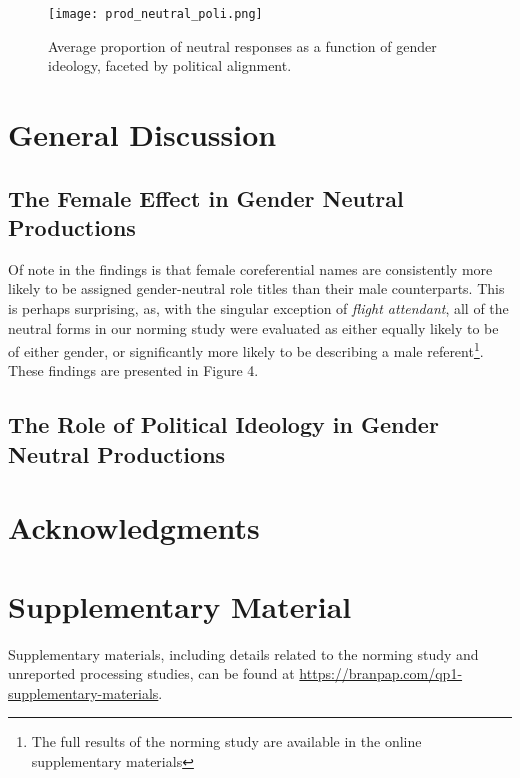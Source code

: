 \begin{figure*}[ht!]
	\centering
	\texttt{[image: prod\_neutral\_poli.png]}
	\caption{Average proportion of neutral responses as a function of gender ideology, faceted by political alignment.}
	\label{prod-neutral-poli}
\end{figure*}
\section{General Discussion}

\subsection{The Female Effect in Gender Neutral Productions}
Of note in the findings is that female coreferential names are consistently more likely to be assigned gender-neutral role titles than their male counterparts. This is perhaps surprising, as, with the singular exception of \textit{flight attendant}, all of the neutral forms in our norming study were evaluated as either equally likely to be of either gender, or significantly more likely to be describing a male referent\footnote{The full results of the norming study are available in the online supplementary materials}. These findings are presented in Figure 4.

\subsection{The Role of Political Ideology in Gender Neutral Productions}

\section{Acknowledgments}

\section{Supplementary Material}
Supplementary materials, including details related to the norming study and unreported processing studies, can be found at \url{https://branpap.com/qp1-supplementary-materials}.

\nocite{labov1963social}